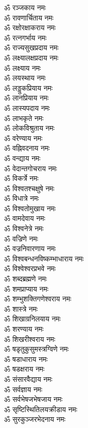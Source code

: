 \begin{multicols}{2}
\begin{flushleft}
ॐ रञ्जकाय नमः\\
ॐ रावणार्चिताय नमः\hfill{}\\
ॐ रक्षोरक्षाकराय नमः\\
ॐ रत्नगर्भाय नमः\\
ॐ राज्यसुखप्रदाय नमः\\
ॐ लक्ष्यालक्षप्रदाय नमः\\
ॐ लक्ष्याय नमः\\
ॐ लयस्थाय नमः\\
ॐ लड्डुकप्रियाय नमः\\
ॐ लानप्रियाय नमः\\
ॐ लास्यपदाय नमः\\
ॐ लाभकृते नमः\hfill{}\\
ॐ लोकविश्रुताय नमः\\
ॐ वरेण्याय नमः\\
ॐ वह्निवदनाय नमः\\
ॐ वन्द्याय नमः\\
ॐ वेदान्तगोचराय नमः\\
ॐ विकर्त्रे नमः\\
ॐ विश्वतश्चक्षुषे नमः\\
ॐ विधात्रे नमः\\
ॐ विश्वतोमुखाय नमः\\
ॐ वामदेवाय नमः\hfill{}\\
ॐ विश्वनेत्रे नमः\\
ॐ वज्रिणे नमः\\
ॐ वज्रनिवारणाय नमः\\
ॐ विश्वबन्धनविष्कम्भाधाराय नमः\\
ॐ विश्वेश्वरप्रभवे नमः\\
ॐ शब्दब्रह्मणे नमः\\
ॐ शमप्राप्याय नमः\\
ॐ शम्भुशक्तिगणेश्वराय नमः\\
ॐ शास्त्रे नमः\\
ॐ शिखाग्रनिलयाय नमः\hfill{}\\
ॐ शरण्याय नमः\\
ॐ शिखरीश्वराय नमः\\
ॐ षडृतुकुसुमस्त्रग्विणे नमः\\
ॐ षडाधाराय नमः\\
ॐ षडक्षराय नमः\\
ॐ संसारवैद्याय नमः\\
ॐ सर्वज्ञाय नमः\\
ॐ सर्वभेषजभेषजाय नमः\\
ॐ सृष्टिस्थितिलयक्रीडाय नमः\\
ॐ सुरकुञ्जरभेदनाय नमः\hfill{}\\

\end{flushleft}
\end{multicols}
